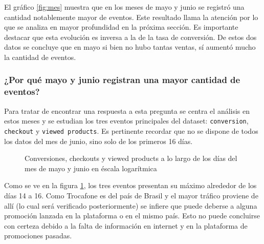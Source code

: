 \documentclass[a4paper]{article}
\begin{document}
El gráfico \ref{fig:mes} muestra que en los meses de mayo y junio se registró una cantidad notablemente mayor de eventos. Este resultado llama la atención por lo que se analiza en mayor profundidad en la próxima sección. Es importante destacar que esta evolución es inversa a la de la tasa de conversión. De estos dos datos se concluye que en mayo si bien no hubo tantas ventas, sí aumentó mucho la cantidad de eventos. 

\subsubsection{¿Por qué mayo y junio registran una mayor cantidad de eventos?}

Para tratar de encontrar una respuesta a esta pregunta se centra el análisis en estos meses y se estudian los tres eventos principales del dataset: \texttt{conversion}, \texttt{checkout} y \texttt{viewed products}. Es pertinente recordar que no se dispone de todos los datos del mes de junio, sino solo de los primeros 16 días.

\begin{figure}[!h]
	\caption{Conversiones, checkouts y viewed products a lo largo de los días del mes de mayo y junio en éscala logarítmica}
	\label{fig:mayojunio}
\end{figure}

Como se ve en la figura \ref{fig:mayojunio}, los tres eventos presentan su máximo alrededor de los días 14 a 16. Como Trocafone es del país de Brasil y el mayor tráfico proviene de allí (lo cual será verificado posteriormente) se infiere que puede deberse a alguna promoción lanzada en la plataforma o en el mismo país. Esto no puede concluirse con certeza debido a la falta de información en internet y en la plataforma de promociones pasadas.
\end{document}
